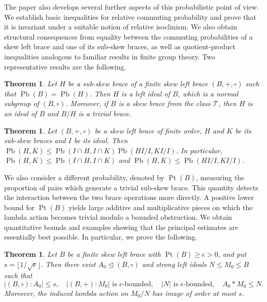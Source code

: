 \documentclass[11pt, oneside]{amsart}
\numberwithin{equation}{section}
\theoremstyle{plain}
\newtheorem{thm}[equation]{Theorem}
\theoremstyle{definition}
\newcommand{\Pb}{\operatorname{Pb} }
\newcommand{\Pt}{\operatorname{Pt} }
\begin{document}
The paper also develops several further aspects of this probabilistic point of view. We establish basic inequalities for relative commuting probability and prove that it is invariant under a suitable notion of relative isoclinism. We also obtain structural consequences from equality between the commuting probabilities of a skew left brace and one of its sub-skew braces, as well as quotient-product inequalities analogous to familiar results in finite group theory. Two representative results are the following.

\begin{thm} %
Let $H$ be a sub-skew brace of a finite skew left brace $(B, +, \circ)$ such that $\Pb(B)=\Pb(H)$. Then $H$ is a left ideal of $B$, which is a normal subgroup of $(B,\circ)$. Moreover, if $B$ is a skew brace from the class $\mathcal{T}$, then $H$ is an ideal of $B$ and $B/H$ is a trivial brace.
\end{thm}

\begin{thm} %
Let $(B,+, \circ)$ be a skew left brace of finite order, $H$ and $K$ be its sub-skew braces and $I$ be its ideal. Then $\Pb(H,K)\leqslant \Pb(I\cap H, I\cap K)\Pb(HI/I,KI/I)$. In particular, $\Pb(H,K)\leqslant \Pb(I\cap H, I\cap K)$ and $\Pb(H,K) \leqslant \Pb(HI/I,KI/I)$.
\end{thm}

We also consider a different probability, denoted by $\Pt(B)$, measuring the proportion of pairs which generate a trivial sub-skew brace. This quantity detects the interaction between the two brace operations more directly. A positive lower bound for $\Pt(B)$ yields large additive and multiplicative pieces on which the lambda action becomes trivial modulo a bounded obstruction. We obtain quantitative bounds and examples showing that the principal estimates are essentially best possible. In particular, we prove the following.

\begin{thm} %
Let $B$ be a finite skew left brace with $\Pt(B)\geqslant\epsilon>0$, and put
$s=\lfloor1/\sqrt{\epsilon}\rfloor$. Then there exist
$A_0\unlhd(B,\circ)$ and strong left ideals $N\leqslant M_0\leqslant B$
such that
$$
|(B,\circ):A_0|\leqslant s,\quad
|(B,+):M_0|\text{ is $\epsilon$-bounded},\quad
|N|\text{ is $\epsilon$-bounded},\quad
A_0*M_0\leqslant N.
$$
Moreover, the induced lambda action on $M_0/N$ has image of order at most $s$.
\end{thm}
\end{document}
